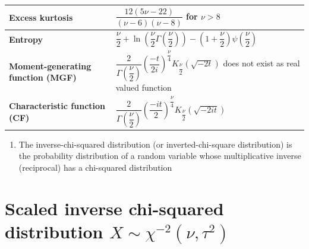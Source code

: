 \begin{customTableWrapper}{2}
\begin{longtable}{|m{6cm}|p{9cm}|}
    \textbf{Excess kurtosis} &
    ${\displaystyle {\dfrac {12(5\nu -22)}{(\nu -6)(\nu -8)}}\!}$ for ${\displaystyle \nu >8\!}$
    \\[1ex] \hline

    \textbf{Entropy} &
    ${\displaystyle {\dfrac {\nu }{2}}\!+\!\ln \!\left({\dfrac {\nu }{2}}\Gamma \!\left({\dfrac {\nu }{2}}\right)\right)} {\displaystyle \!-\!\left(1\!+\!{\dfrac {\nu }{2}}\right)\psi \!\left({\dfrac {\nu }{2}}\right)}$
    \\[1ex] \hline

    \textbf{Moment-generating function (MGF)} &
    ${\displaystyle {\dfrac {2}{\Gamma ({\dfrac {\nu }{2}})}}\left({\dfrac {-t}{2i}}\right)^{\!\!{\dfrac {\nu }{4}}}K_{\dfrac {\nu }{2}}\!\left({\sqrt {-2t}}\right)}$ does not exist as real valued function
    \\[1ex] \hline

    \textbf{Characteristic function (CF)} &
    ${\displaystyle {\dfrac {2}{\Gamma ({\dfrac {\nu }{2}})}}\left({\dfrac {-it}{2}}\right)^{\!\!{\dfrac {\nu }{4}}}K_{\dfrac {\nu }{2}}\!\left({\sqrt {-2it}}\right)}$
    \\[1ex] \hline

\end{longtable}
\end{customTableWrapper}


\begin{enumerate}
    \item The inverse-chi-squared distribution (or inverted-chi-square distribution) is the probability distribution of a random variable whose multiplicative inverse (reciprocal) has a chi-squared distribution

\end{enumerate}


\section{Scaled inverse chi-squared distribution $X \sim \chi^{-2}(\nu, \tau^2)$ \cite{wiki/Scaled_inverse_chi-squared_distribution}} \label{Scaled inverse chi-squared distribution}

